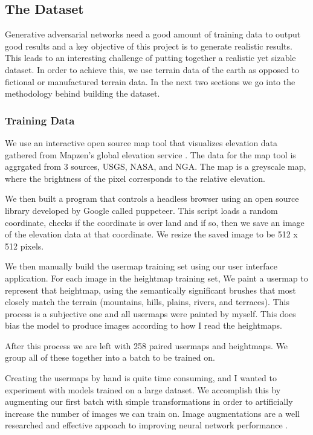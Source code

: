 \documentclass[twocolumn]{article}
\begin{document}
	\subsection{The Dataset}
	
	Generative adversarial networks need a good amount of training data to output good results and a key objective of this project is to generate realistic results. This leads to an interesting challenge of putting together a realistic yet sizable dataset. In order to achieve this, we use terrain data of the earth as opposed to fictional or manufactured terrain data. In the next two sections we go into the methodology behind building the dataset.

	\subsubsection{Training Data}
	
	We use an interactive open source map tool that visualizes elevation data gathered from Mapzen's global elevation service \cite{richardson2016mapzen}. The data for the map tool is aggrgated from 3 sources, USGS, NASA, and NGA. The map is a greyscale map, where the brightness of the pixel corresponds to the relative elevation.
	
	We then built a program that controls a headless browser using an open source library developed by Google called puppeteer. This script loads a random coordinate, checks if the coordinate is over land and if so, then we save an image of the elevation data at that coordinate. We resize the saved image to be 512 x 512 pixels.
	
	We then manually build the usermap training set using our user interface application. For each image in the heightmap training set, We paint a usermap to represent that heightmap, using the semantically significant brushes that most closely match the terrain (mountains, hills, plains, rivers, and terraces). This process is a subjective one and all usermaps were painted by myself. This does bias the model to produce images according to how I read the heightmaps.

	After this process we are left with 258 paired usermaps and heightmaps. We group all of these together into a batch to be trained on.

	Creating the usermaps by hand is quite time consuming, and I wanted to experiment with models trained on a large dataset. We accomplish this by augmenting our first batch with simple transformations in order to artificially increase the number of images we can train on. Image augmentations are a well researched and effective appoach to improving neural network performance \cite{perez2017effectiveness}.
	
\end{document}
